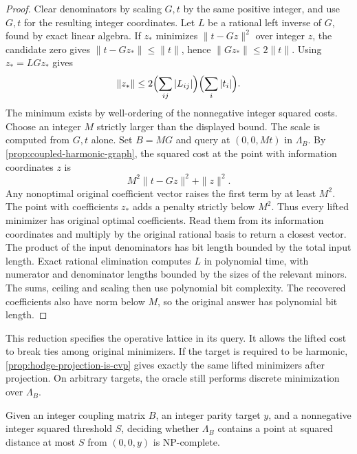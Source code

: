 \begin{proof}
Clear denominators by scaling \(G,t\) by the same positive integer, and use
\(G,t\) for the resulting integer coordinates. Let \(L\) be a rational left
inverse of \(G\), found by exact linear algebra. If \(z_*\) minimizes
\(\|t-Gz\|^2\) over integer \(z\), the candidate zero gives
\(\|t-Gz_*\|\leq\|t\|\), hence \(\|Gz_*\|\leq 2\|t\|\). Using
\(z_*=LGz_*\) gives
\[
 \|z_*\|\leq 2\Bigl(\sum_{ij}|L_{ij}|\Bigr)\Bigl(\sum_i|t_i|\Bigr).
\]
The minimum exists by well-ordering of the nonnegative integer squared costs.
Choose an integer \(M\) strictly larger than the displayed bound. The scale
is computed from \(G,t\) alone. Set \(B=MG\) and query at \((0,0,Mt)\) in
\(\Lambda_B\). By \cref{prop:coupled-harmonic-graph}, the squared cost at the
point with information coordinates \(z\) is
\[
 M^2\|t-Gz\|^2+\|z\|^2.
\]
Any nonoptimal original coefficient vector raises the first term by at least
\(M^2\). The point with coefficients \(z_*\) adds a penalty strictly below
\(M^2\). Thus every lifted minimizer has original optimal coefficients. Read
them from its information coordinates and multiply by the original rational
basis to return a closest vector. The product of the input denominators has
bit length bounded by the total input length. Exact rational elimination
computes \(L\) in polynomial time, with numerator and denominator lengths
bounded by the sizes of the relevant minors. The sums, ceiling and scaling
then use polynomial bit complexity. The recovered coefficients also have
norm below \(M\), so the original answer has polynomial bit length.
\end{proof}

This reduction specifies the operative lattice in its query. It allows the
lifted cost to break ties among original minimizers. If the target is required
to be harmonic, \cref{prop:hodge-projection-is-cvp} gives exactly the same
lifted minimizers after projection. On arbitrary targets, the oracle still
performs discrete minimization over \(\Lambda_B\).

\begin{corollary}
\label{cor:coupled-cvp-np-complete}
Given an integer coupling matrix \(B\), an integer parity target \(y\), and
a nonnegative integer squared threshold \(S\), deciding whether
\(\Lambda_B\) contains a point at squared distance at most \(S\) from
\((0,0,y)\) is NP-complete.
\end{corollary}

